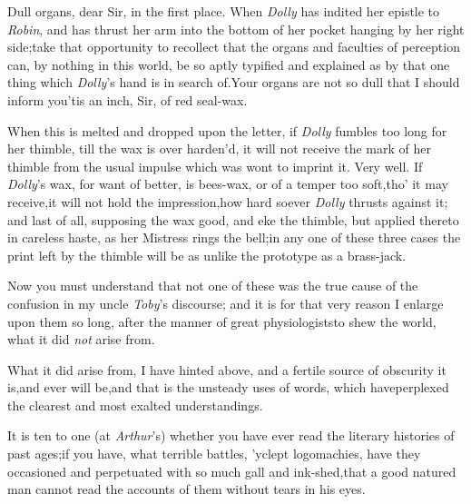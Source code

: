 \documentclass{article}
\begin{document}
Dull organs, dear Sir, in the first place. 
\pb
When \textit{Dolly} has indited her epistle to \textit{Robin},
and has thrust her arm into the bottom of her pocket hanging by
her right side;\tsk take that opportunity to recollect that the
organs and faculties of perception can, by nothing in this
world, be so aptly typified and explained as by that one thing
which \textit{Dolly}’s hand is in search of.\tsk Your organs are
not so dull that I should inform you\tsk ’tis an inch, Sir, of
red seal-wax.

When this is melted and dropped upon the letter, if \textit{Dolly}
fumbles too long for her thimble, till the wax is over harden’d, it
will not receive the mark of her thimble from the usual impulse
which was wont to imprint it. Very well. If \textit{Dolly}’s
wax, for want of better, is bees-wax, or of a temper too
soft,\tsk tho’ it may receive,\tsk it will not hold the
impression,\pb how hard soever \textit{Dolly} thrusts against it; and
last of all, supposing the wax good, and eke the thimble, but
applied thereto in careless haste, as her Mistress rings the bell;\tsh in any one of
these three cases the print left by the thimble will be as unlike
the prototype as a brass-jack.

Now you must understand that not one of these was the true cause
of the confusion in my uncle \textit{Toby}’s discourse; and it
is for that very reason I enlarge upon them so long, after the
manner of great physiologists\tsk to shew the world, what it did
\textit{not} arise from.

What it did arise from, I have hinted above, and a fertile
source of obscurity it is,\tsk and ever will be,\tsk and that
is the unsteady uses of words, which have\pb perplexed the clearest
and most exalted understandings.

It is ten to one (at \textit{Arthur}’s) whether you have
ever read the literary histories of past ages;\tsk if you have,
what terrible battles, ’yclept logomachies, have they
occasioned and perpetuated with so much gall and
ink-shed,\tsk that a good natured man cannot read the accounts of
them without tears in his eyes.
\end{document}
